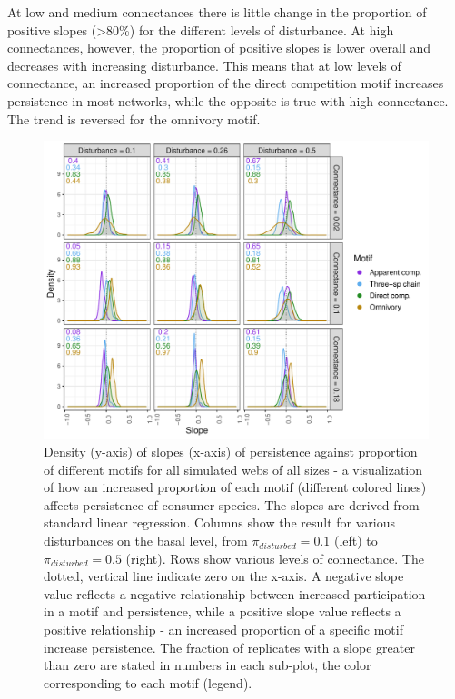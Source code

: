 \documentclass[12pt]{article}
\begin{document}
\begin{spacing}{2.0}
            
            At low and medium connectances there is little change in the proportion of positive slopes (\textgreater80\%) for the different levels of disturbance. 
            At high connectances, however, the proportion of positive slopes is lower overall and decreases with increasing disturbance. 
            This means that at low levels of connectance, an increased proportion of the direct competition motif increases persistence in most networks, while the opposite is true with high connectance. 
            The trend is reversed for the omnivory motif.


        \begin{figure}
            \centering
            \includegraphics[width=\textwidth]{figures/prop_dens_bp_vs_C_allS.pdf}
            \caption{Density (y-axis) of slopes (x-axis) of persistence against proportion of different motifs for all simulated webs of all sizes - a visualization of how an increased proportion of each motif (different colored lines) affects persistence of consumer species. The slopes are derived from standard linear regression. Columns show the result for various disturbances on the basal level, from $\pi_{disturbed} = 0.1$ (left) to $\pi_{disturbed} = 0.5$ (right). Rows show various levels of connectance. The dotted, vertical line indicate zero on the x-axis. A negative slope value reflects a negative relationship between increased participation in a motif and persistence, while a positive slope value reflects a positive relationship - an increased proportion of a specific motif increase persistence. The fraction of replicates with a slope greater than zero are stated in numbers in each sub-plot, the color corresponding to each motif (legend). }
            \label{fig:density_prop_C}
        \end{figure}    
    


\end{spacing}
\end{document}
